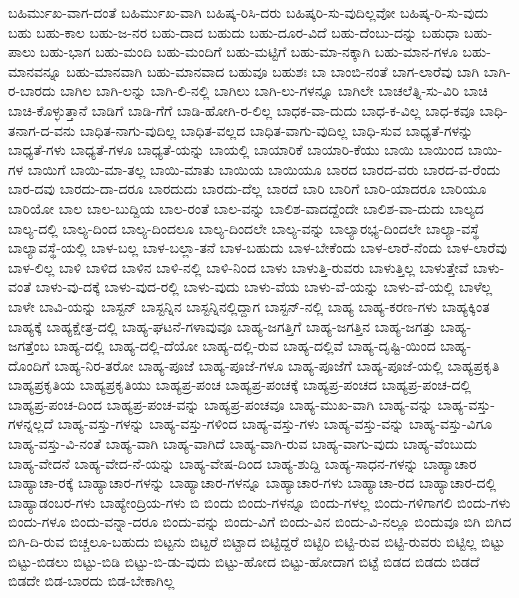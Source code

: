 {ಬಹಿರ್ಮುಖ-ವಾಗ-ದಂತೆ
ಬಹಿರ್ಮುಖ-ವಾಗಿ
ಬಹಿಷ್ಕ-ರಿಸಿ-ದರು
ಬಹಿಷ್ಕರಿ-ಸು-ವುದಿಲ್ಲವೋ
ಬಹಿಷ್ಕ-ರಿ-ಸು-ವುದು
ಬಹು
ಬಹು-ಕಾಲ
ಬಹು-ಜ-ನರ
ಬಹು-ದಾದ
ಬಹುದು
ಬಹು-ದೂರ-ವಿದೆ
ಬಹು-ದೆಂಬು-ದನ್ನು
ಬಹುಧಾ
ಬಹು-ಪಾಲು
ಬಹು-ಭಾಗ
ಬಹು-ಮಂದಿ
ಬಹು-ಮಂದಿಗೆ
ಬಹು-ಮಟ್ಟಿಗೆ
ಬಹು-ಮಾ-ನಕ್ಕಾಗಿ
ಬಹು-ಮಾನ-ಗಳೂ
ಬಹು-ಮಾನವನ್ನೂ
ಬಹು-ಮಾನವಾಗಿ
ಬಹು-ಮಾನವಾದ
ಬಹುವೂ
ಬಹುಶಃ
ಬಾ
ಬಾಂಬಿ-ನಂತೆ
ಬಾಗ-ಲಾರೆವು
ಬಾಗಿ
ಬಾಗಿ-ರ-ಬಾರದು
ಬಾಗಿಲ
ಬಾಗಿ-ಲನ್ನು
ಬಾಗಿ-ಲಿ-ನಲ್ಲಿ
ಬಾಗಿಲು
ಬಾಗಿ-ಲು-ಗಳನ್ನೂ
ಬಾಗಿಲೇ
ಬಾಚಲೆತ್ನಿ-ಸು-ವಿರಿ
ಬಾಚಿ
ಬಾಚಿ-ಕೊಳ್ಳುತ್ತಾನೆ
ಬಾಡಿಗೆ
ಬಾಡಿ-ಗೆಗೆ
ಬಾಡಿ-ಹೋಗಿ-ರ-ಲಿಲ್ಲ
ಬಾಧಕ-ವಾ-ದುದು
ಬಾಧ-ಕ-ವಿಲ್ಲ
ಬಾಧ-ಕವೂ
ಬಾಧಿ-ತನಾಗ-ದ-ವನು
ಬಾಧಿತ-ನಾಗು-ವುದಿಲ್ಲ
ಬಾಧಿತ-ವಲ್ಲದ
ಬಾಧಿತ-ವಾಗು-ವುದಿಲ್ಲ
ಬಾಧಿ-ಸುವ
ಬಾಧ್ಯತೆ-ಗಳನ್ನು
ಬಾಧ್ಯತೆ-ಗಳು
ಬಾಧ್ಯತೆ-ಗಳೂ
ಬಾಧ್ಯತೆ-ಯನ್ನು
ಬಾಯಲ್ಲಿ
ಬಾಯಾರಿಕೆ
ಬಾಯಾರಿ-ಕೆಯು
ಬಾಯಿ
ಬಾಯಿಂದ
ಬಾಯಿ-ಗಳ
ಬಾಯಿಗೆ
ಬಾಯಿ-ಮಾ-ತಲ್ಲ
ಬಾಯಿ-ಮಾತು
ಬಾಯಿಯ
ಬಾಯಿಯೂ
ಬಾರದ
ಬಾರದ-ವರು
ಬಾರದ-ವ-ರೆಂದು
ಬಾರ-ದವು
ಬಾರದು-ದಾ-ದರೂ
ಬಾರದುದು
ಬಾರದು-ದೆಲ್ಲ
ಬಾರದೆ
ಬಾರಿ
ಬಾರಿಗೆ
ಬಾರಿ-ಯಾದರೂ
ಬಾರಿಯೂ
ಬಾರಿಯೋ
ಬಾಲ
ಬಾಲ-ಬುದ್ದಿಯ
ಬಾಲ-ರಂತೆ
ಬಾಲ-ವನ್ನು
ಬಾಲಿಶ-ವಾದದ್ದೆಂದೇ
ಬಾಲಿಶ-ವಾ-ದುದು
ಬಾಲ್ಯದ
ಬಾಲ್ಯ-ದಲ್ಲಿ
ಬಾಲ್ಯ-ದಿಂದ
ಬಾಲ್ಯ-ದಿಂದಲೂ
ಬಾಲ್ಯ-ದಿಂದಲೇ
ಬಾಲ್ಯ-ವನ್ನು
ಬಾಲ್ಯಾರಭ್ಯ-ದಿಂದಲೇ
ಬಾಲ್ಯಾ-ವಸ್ಥೆ
ಬಾಲ್ಯಾವಸ್ಥೆ-ಯಲ್ಲಿ
ಬಾಳ-ಬಲ್ಲ
ಬಾಳ-ಬಲ್ಲಾ-ತನೆ
ಬಾಳ-ಬಹುದು
ಬಾಳ-ಬೇಕೆಂದು
ಬಾಳ-ಲಾರೆ-ನೆಂದು
ಬಾಳ-ಲಾರೆವು
ಬಾಳ-ಲಿಲ್ಲ
ಬಾಳಿ
ಬಾಳಿದ
ಬಾಳಿನ
ಬಾಳಿ-ನಲ್ಲಿ
ಬಾಳಿ-ನಿಂದ
ಬಾಳು
ಬಾಳುತ್ತಿ-ರುವರು
ಬಾಳುತ್ತಿಲ್ಲ
ಬಾಳುತ್ತೇವೆ
ಬಾಳು-ವಂತೆ
ಬಾಳು-ವು-ದಕ್ಕೆ
ಬಾಳು-ವುದ-ರಲ್ಲಿ
ಬಾಳು-ವುದು
ಬಾಳು-ವೆಯ
ಬಾಳು-ವೆ-ಯನ್ನು
ಬಾಳು-ವೆ-ಯಲ್ಲಿ
ಬಾಳೆಲ್ಲ
ಬಾಳೇ
ಬಾವಿ-ಯನ್ನು
ಬಾಸ್ಟನ್
ಬಾಸ್ಟನ್ನಿನ
ಬಾಸ್ಟನ್ನಿನಲ್ಲಿದ್ದಾಗ
ಬಾಸ್ಟನ್-ನಲ್ಲಿ
ಬಾಹ್ಯ
ಬಾಹ್ಯ-ಕರಣ-ಗಳು
ಬಾಹ್ಯಕ್ಕಿಂತ
ಬಾಹ್ಯಕ್ಕೆ
ಬಾಹ್ಯಕ್ಷೇತ್ರ-ದಲ್ಲಿ
ಬಾಹ್ಯ-ಘಟನೆ-ಗಳಾವುವೂ
ಬಾಹ್ಯ-ಜಗತ್ತಿಗೆ
ಬಾಹ್ಯ-ಜಗತ್ತಿನ
ಬಾಹ್ಯ-ಜಗತ್ತು
ಬಾಹ್ಯ-ಜಗತ್ತೆಂಬ
ಬಾಹ್ಯ-ದಲ್ಲಿ
ಬಾಹ್ಯ-ದಲ್ಲಿ-ದೆಯೋ
ಬಾಹ್ಯ-ದಲ್ಲಿ-ರುವ
ಬಾಹ್ಯ-ದಲ್ಲಿವೆ
ಬಾಹ್ಯ-ದೃಷ್ಟಿ-ಯಿಂದ
ಬಾಹ್ಯ-ದೊಂದಿಗೆ
ಬಾಹ್ಯ-ನಿರ-ತರೋ
ಬಾಹ್ಯ-ಪೂಜೆ
ಬಾಹ್ಯ-ಪೂಜೆ-ಗಳೂ
ಬಾಹ್ಯ-ಪೂಜೆಗೆ
ಬಾಹ್ಯ-ಪೂಜೆ-ಯಲ್ಲಿ
ಬಾಹ್ಯಪ್ರಕೃತಿ
ಬಾಹ್ಯಪ್ರಕೃತಿಯ
ಬಾಹ್ಯಪ್ರಕೃತಿಯು
ಬಾಹ್ಯಪ್ರ-ಪಂಚ
ಬಾಹ್ಯಪ್ರ-ಪಂಚಕ್ಕೆ
ಬಾಹ್ಯಪ್ರ-ಪಂಚದ
ಬಾಹ್ಯಪ್ರ-ಪಂಚ-ದಲ್ಲಿ
ಬಾಹ್ಯಪ್ರ-ಪಂಚ-ದಿಂದ
ಬಾಹ್ಯಪ್ರ-ಪಂಚ-ವನ್ನು
ಬಾಹ್ಯಪ್ರ-ಪಂಚವೂ
ಬಾಹ್ಯ-ಮುಖ-ವಾಗಿ
ಬಾಹ್ಯ-ವನ್ನು
ಬಾಹ್ಯ-ವಸ್ತು-ಗಳನ್ನಲ್ಲದೆ
ಬಾಹ್ಯ-ವಸ್ತು-ಗಳನ್ನು
ಬಾಹ್ಯ-ವಸ್ತು-ಗಳಿಂದ
ಬಾಹ್ಯ-ವಸ್ತು-ಗಳು
ಬಾಹ್ಯ-ವಸ್ತು-ವನ್ನು
ಬಾಹ್ಯ-ವಸ್ತು-ವಿಗೂ
ಬಾಹ್ಯ-ವಸ್ತು-ವಿ-ನಂತೆ
ಬಾಹ್ಯ-ವಾಗಿ
ಬಾಹ್ಯ-ವಾಗಿದೆ
ಬಾಹ್ಯ-ವಾಗಿ-ರುವ
ಬಾಹ್ಯ-ವಾಗು-ವುದು
ಬಾಹ್ಯ-ವೆಂಬುದು
ಬಾಹ್ಯ-ವೇದನೆ
ಬಾಹ್ಯ-ವೇದ-ನೆ-ಯನ್ನು
ಬಾಹ್ಯ-ವೇಷ-ದಿಂದ
ಬಾಹ್ಯ-ಶುದ್ದಿ
ಬಾಹ್ಯ-ಸಾಧನ-ಗಳನ್ನು
ಬಾಹ್ಯಾಚಾರ
ಬಾಹ್ಯಾಚಾ-ರಕ್ಕೆ
ಬಾಹ್ಯಾಚಾರ-ಗಳನ್ನು
ಬಾಹ್ಯಾಚಾರ-ಗಳನ್ನೂ
ಬಾಹ್ಯಾಚಾರ-ಗಳು
ಬಾಹ್ಯಾಚಾ-ರದ
ಬಾಹ್ಯಾಚಾರ-ದಲ್ಲಿ
ಬಾಹ್ಯಾಡಂಬರ-ಗಳು
ಬಾಹ್ಯೇಂದ್ರಿಯ-ಗಳು
ಬಿ
ಬಿಂದು
ಬಿಂದು-ಗಳನ್ನೂ
ಬಿಂದು-ಗಳಲ್ಲ
ಬಿಂದು-ಗಳಿಗಾಗಲಿ
ಬಿಂದು-ಗಳು
ಬಿಂದು-ಗಳೂ
ಬಿಂದು-ವನ್ನಾ-ದರೂ
ಬಿಂದು-ವನ್ನು
ಬಿಂದು-ವಿಗೆ
ಬಿಂದು-ವಿನ
ಬಿಂದು-ವಿ-ನಲ್ಲೂ
ಬಿಂದುವೂ
ಬಿಗಿ
ಬಿಗಿದ
ಬಿಗಿ-ದಿ-ರುವ
ಬಿಚ್ಚಲೂ-ಬಹುದು
ಬಿಟ್ಟನು
ಬಿಟ್ಟರೆ
ಬಿಟ್ಟಾದ
ಬಿಟ್ಟಿದ್ದರೆ
ಬಿಟ್ಟಿರಿ
ಬಿಟ್ಟಿ-ರುವ
ಬಿಟ್ಟಿ-ರುವರು
ಬಿಟ್ಟಿಲ್ಲ
ಬಿಟ್ಟು
ಬಿಟ್ಟು-ಬಿಡಲು
ಬಿಟ್ಟು-ಬಿಡಿ
ಬಿಟ್ಟು-ಬಿ-ಡು-ವುದು
ಬಿಟ್ಟು-ಹೋದ
ಬಿಟ್ಟು-ಹೋದಾಗ
ಬಿಟ್ಟೆ
ಬಿಡದ
ಬಿಡದು
ಬಿಡದೆ
ಬಿಡದೇ
ಬಿಡ-ಬಾರದು
ಬಿಡ-ಬೇಕಾಗಿಲ್ಲ
}
